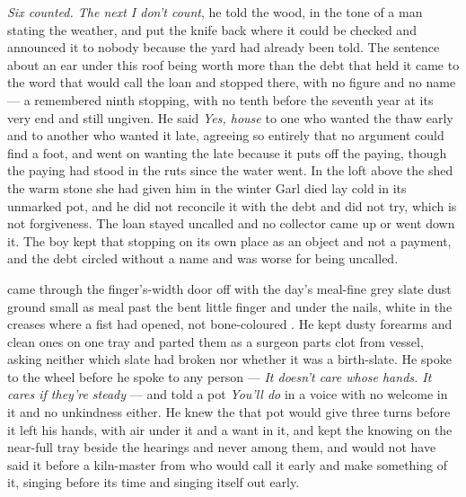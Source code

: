 \emph{Six counted. The next I don't count}, he told the wood, in the tone of a man stating the weather, and put the knife back where it could be checked and announced it to nobody because the yard had already been told. The sentence about an ear under this roof being worth more than the debt that held it came to the word that would call the loan and stopped there, with no figure and no name --- a remembered ninth stopping, with no tenth before the seventh year at its very end and still ungiven. He said \emph{Yes, house} to one who wanted the thaw early and to another who wanted it late, agreeing so entirely that no argument could find a foot, and went on wanting the late because it puts off the paying, though the paying had stood in the ruts since the water went. In the loft above the shed the warm stone she had given him in the winter Garl died lay cold in its unmarked pot, and he did not reconcile it with the debt and did not try, which is not forgiveness. The loan stayed uncalled and no collector came up  or went down it. The boy kept that stopping on its own place as an object and not a payment, and the debt circled without a name and was worse for being uncalled.

\scenebreak

 came through the finger's-width door off  with the day's meal-fine grey slate dust ground small as meal past the bent little finger and under the nails, white in the creases where a fist had opened, not bone-coloured . He kept dusty forearms and clean ones on one tray and parted them as a surgeon parts clot from vessel, asking neither which slate had broken nor whether it was a birth-slate. He spoke to the wheel before he spoke to any person --- \emph{It doesn't care whose hands. It cares if they're steady} --- and told a pot \emph{You'll do} in a voice with no welcome in it and no unkindness either. He knew the  that pot would give three turns before it left his hands, with air under it and a want in it, and kept the knowing on the near-full tray beside the hearings and never among them, and would not have said it before a kiln-master from  who would call it early and make something of it, singing before its time and singing itself out early.

